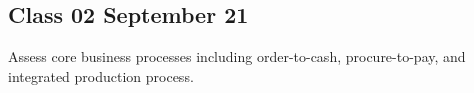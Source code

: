 \subsection{Class 02 September 21 }
      Assess core business processes including order-to-cash, procure-to-pay, and integrated production process.